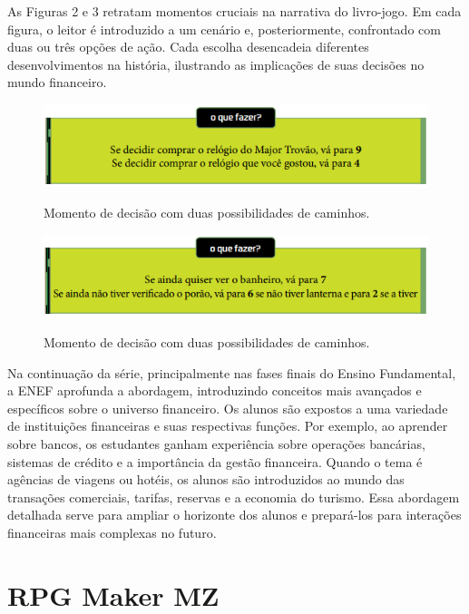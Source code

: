 As Figuras 2 e 3 retratam momentos cruciais na narrativa do livro-jogo. Em cada figura, o leitor é introduzido a um cenário e, posteriormente, confrontado com duas ou três opções de ação. Cada escolha desencadeia diferentes desenvolvimentos na história, ilustrando as implicações de suas decisões no mundo financeiro.

\begin{figure}[ht]
	\centering
	\caption{Momento de decisão com duas possibilidades de caminhos.}
	\includegraphics[scale=.85]{Textuais/Pictures/Picture2.png}
	\label{fig:figure-2}
\end{figure}

\begin{figure}[ht]
	\centering
	\caption{Momento de decisão com duas possibilidades de caminhos.}
	\includegraphics[scale=.85]{Textuais/Pictures/Picture3.png}
	\label{fig:figure-3}
\end{figure}

\newpage

Na continuação da série, principalmente nas fases finais do Ensino Fundamental, a ENEF aprofunda a abordagem, introduzindo conceitos mais avançados e específicos sobre o universo financeiro. Os alunos são expostos a uma variedade de instituições financeiras e suas respectivas funções. Por exemplo, ao aprender sobre bancos, os estudantes ganham experiência sobre operações bancárias, sistemas de crédito e a importância da gestão financeira. Quando o tema é agências de viagens ou hotéis, os alunos são introduzidos ao mundo das transações comerciais, tarifas, reservas e a economia do turismo. Essa abordagem detalhada serve para ampliar o horizonte dos alunos e prepará-los para interações financeiras mais complexas no futuro.

\section{RPG Maker MZ}


